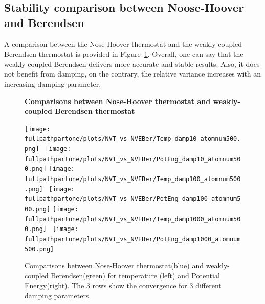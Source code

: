 \documentclass[10pt,a4paper]{report}
\def \fullpathpartone {/home/lukas/Desktop/project/independence/atomistic_modeling/exam/1_three-dimensional_atomic_system}
\newcommand*{\figuretitle}[1]{%
    {\centering%
    \textbf{#1}%
    \par\medskip}%
}
\begin{document}
\subsection{Stability comparison between Noose-Hoover and Berendsen}
A comparison between the Nose-Hoover thermostat and the weakly-coupled Berendsen thermostat is provided in Figure~\ref{fig:p1_NVT_vs_NVEBer}.
Overall, one can say that the weakly-coupled Berendsen delivers more accurate and stable results. Also, it does not benefit from damping, on the contrary, the relative variance increases with an increasing damping parameter.

\begin{center}
\begin{figure}[h]
\figuretitle{Comparisons between Nose-Hoover thermostat and weakly-coupled Berendsen thermostat}
\texttt{[image: \\fullpathpartone/plots/NVT\_vs\_NVEBer/Temp\_damp10\_atomnum500.png]}~
\texttt{[image: \\fullpathpartone/plots/NVT\_vs\_NVEBer/PotEng\_damp10\_atomnum500.png]}
\texttt{[image: \\fullpathpartone/plots/NVT\_vs\_NVEBer/Temp\_damp100\_atomnum500.png]}~
\texttt{[image: \\fullpathpartone/plots/NVT\_vs\_NVEBer/PotEng\_damp100\_atomnum500.png]}
\texttt{[image: \\fullpathpartone/plots/NVT\_vs\_NVEBer/Temp\_damp1000\_atomnum500.png]}~
\texttt{[image: \\fullpathpartone/plots/NVT\_vs\_NVEBer/PotEng\_damp1000\_atomnum500.png]}
\caption[Comparisons between Nose-Hoover thermostat and weakly-coupled Berendsen thermostat - time convergence]{Comparisons between Nose-Hoover thermostat(blue) and weakly-coupled Berendsen(green) for temperature (left) and Potential Energy(right). The 3 rows show the convergence for 3 different damping parameters.}
\label{fig:p1_NVT_vs_NVEBer}
\end{figure}
\end{center}
\end{document}
